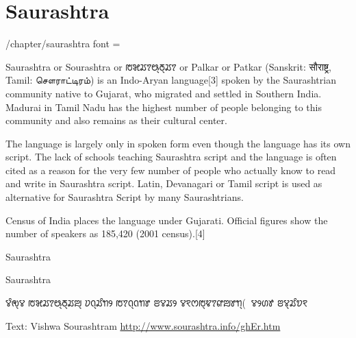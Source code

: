 \section{Saurashtra}
\label{sec:saurashtra}

\newfontfamily{}
\def\test{}
\cxset{saurashtra font/.code=\test}

\begin{key}{/chapter/saurashtra font = }

\end{key}
Saurashtra or Sourashtra or {\saurashtra ꢱꣃꢬꢵꢰ꣄ꢜ꣄ꢬꢵ} or Palkar or Patkar (Sanskrit: सौराष्ट्र, Tamil: சௌராட்டிரம்) is an Indo-Aryan language[3] spoken by the Saurashtrian community native to Gujarat, who migrated and settled in Southern India. Madurai in Tamil Nadu has the highest number of people belonging to this community and also remains as their cultural center.

The language is largely only in spoken form even though the language has its own script. The lack of schools teaching Saurashtra script and the language is often cited as a reason for the very few number of people who actually know to read and write in Saurashtra script. Latin, Devanagari or Tamil script is used as alternative for Saurashtra Script by many Saurashtrians.

Census of India places the language under Gujarati. Official figures show the number of speakers as 185,420 (2001 census).[4]


\begin{scriptexample}[]{Saurashtra}
\end{scriptexample}


\begin{scriptexample}[]{Saurashtra}
\bgroup
\saurashtra

ꢮꢶꢯ꣄ꢮ ꢱꣃꢬꢵꢰ꣄ꢜ꣄ꢬꢪ꣄ ꢦꢡ꣄ꢬꢶꢒꢾ ꢱꢵꢡ꣄ꢡꢒꢸ ꢂꢮꢬꢾ
ꢮꣁꢭꢱ꣄ꢢꢵꢥꢪꢸꢒ꣄(ꣀꢵꢮꢾꢔꢹ ꢂꢮ꣄ꢬꢶꢫꣁ


\arial

Text: Vishwa Sourashtram \url{http://www.sourashtra.info/ghEr.htm}
\egroup
\end{scriptexample}


